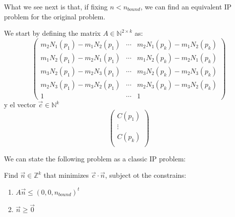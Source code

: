 \documentclass[12pt, letterpaper]{article}
\begin{document}
What we see next is that, if fixing $n < n_{bound}$, we can find an equivalent IP problem for the original problem.
\par
\vspace{10px}
We start by defining the matrix $A\in\mathbb{N}^{2\times k}$ as:
\begin{equation}
    \begin{pmatrix}
        m_2N_1(p_1)  - m_1N_2(p_1)& \cdots & m_2N_1(p_k) - m_1N_2(p_k)\\
        m_1N_2(p_1)  - m_2N_1(p_1)& \cdots & m_1N_2(p_k) - m_2N_1(p_k)\\
        m_3N_2(p_1)  - m_2N_3(p_1)& \cdots & m_3N_2(p_k) - m_2N_3(p_k)\\
        m_2N_3(p_1)  - m_3N_2(p_1)& \cdots & m_2N_3(p_k) - m_3N_2(p_k)\\
        1 & \cdots & 1
    \end{pmatrix}
\end{equation}
y el vector $\vec{c}\in\mathbb{N}^k$
\begin{equation}
    \begin{pmatrix}
        C(p_1) \\
        \vdots \\
        C(p_k) \\
    \end{pmatrix}
\end{equation}
\par
\vspace{10px}
We can state the following problem as a classic IP problem:
\par
\vspace{5px}
Find $\vec{n}\in\mathbb{Z}^k$ that minimizes $\vec{c}\cdot\vec{n}$, subject ot the constrains:
\begin{enumerate}
    \item $A\vec{n} \leq (0, 0, n_{bound})^t$
    \item $\vec{n}\geq\vec{0}$
\end{enumerate}
\end{document}
